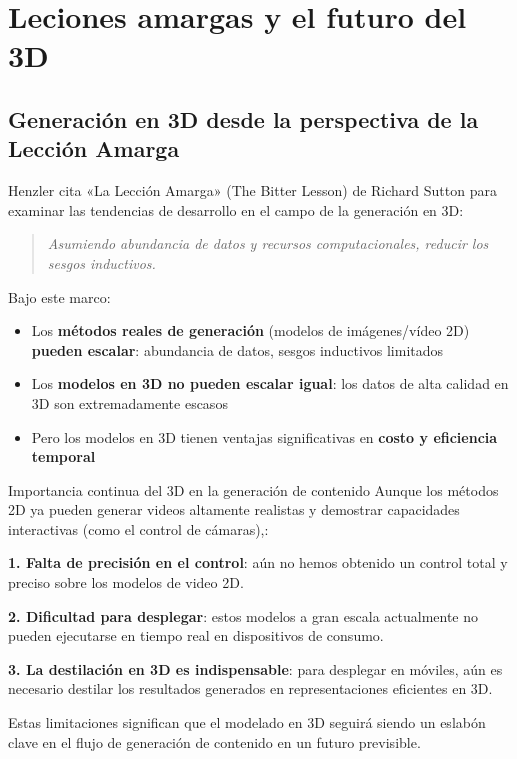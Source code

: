 \section{Leciones amargas y el futuro del 3D}

\subsection{Generación en 3D desde la perspectiva de la Lección Amarga}

Henzler cita «La Lección Amarga» (The Bitter Lesson) de Richard Sutton para examinar las tendencias de desarrollo en el campo de la generación en 3D:

\begin{quote}
\textit{Asumiendo abundancia de datos y recursos computacionales, reducir los sesgos inductivos.}
\end{quote}

Bajo este marco:
\begin{itemize}
    \item Los \textbf{métodos reales de generación} (modelos de imágenes/vídeo 2D) \textbf{pueden escalar}: abundancia de datos, sesgos inductivos limitados
    \item Los \textbf{modelos en 3D no pueden escalar igual}: los datos de alta calidad en 3D son extremadamente escasos
    \item Pero los modelos en 3D tienen ventajas significativas en \textbf{costo y eficiencia temporal}
\end{itemize}

\begin{importantbox}{Importancia continua del 3D en la generación de contenido}
Aunque los métodos 2D ya pueden generar videos altamente realistas y demostrar capacidades interactivas (como el control de cámaras),:

\textbf{1. Falta de precisión en el control}: aún no hemos obtenido un control total y preciso sobre los modelos de video 2D.

\textbf{2. Dificultad para desplegar}: estos modelos a gran escala actualmente no pueden ejecutarse en tiempo real en dispositivos de consumo.

\textbf{3. La destilación en 3D es indispensable}: para desplegar en móviles, aún es necesario destilar los resultados generados en representaciones eficientes en 3D.

Estas limitaciones significan que el modelado en 3D seguirá siendo un eslabón clave en el flujo de generación de contenido en un futuro previsible.
\end{importantbox}

